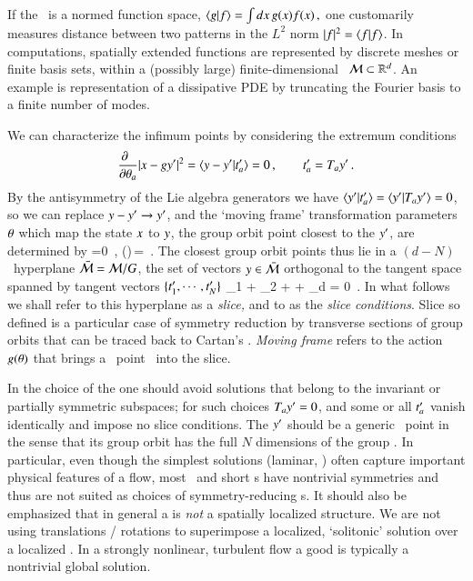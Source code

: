 \documentclass[preprint,12pt]{elsarticle} %
\begin{document}
If the \statesp\ is a normed function space,
\( %
\braket{g}{f} = \int dx \, {g}(x) f(x)
\,,
\) %
one customarily measures distance between two patterns in the $L^2$ norm
$|f|^2 = \braket{f}{f}$. In computations, spatially extended functions are
represented by discrete meshes or finite basis sets, within a (possibly
large) finite-dimensional \statesp\  ${\cal M} \subset \mathbb{R}^d$. An example
is representation of a dissipative PDE by truncating the Fourier basis
 to a finite number of modes.

We can characterize the infimum points by considering the extremum conditions
\[ %
\frac{\partial ~~}{\partial \gSpace_a} |\ssp - \LieEl\slicep|^2
   =
\braket{\sspRed - \slicep}{\sliceTan{a}}
   = 0
    \,,\qquad
	  \sliceTan{a} = \Lg_a \slicep
\,.
\] %
By the antisymmetry of the Lie algebra generators we have
$\braket{\slicep}{\sliceTan{a}} = \braket{\slicep}{\Lg_{a}\slicep}=0$, so
we can replace $y - {y'} \to {\ensuremath{y'}}$, and the
`moving frame' transformation
parameters ${\bf \theta}$ which map the state $x$ to $y$, the group
orbit point closest to the {\template} ${y'}$, are determined by
\beq
{} =0
    \,,\qquad
\LieEl(\gSpace)\,\sspRed = \ssp
\,.
The closest group orbit points thus lie in a $(d\!-\!N)$\dmn\ hyperplane
$\bar{\cal M} = {\cal M}/G$, the set of vectors $y \in  \bar{\cal M}$
orthogonal to the {\template} tangent space spanned by tangent vectors
$\{t'_{1},\cdots,t'_{N}\}$
\beq
\sspRed_1 + \sspRed_2
  + \cdots + \sspRed_d = 0
\,.
In what follows we shall refer to this hyperplane as a \emph{slice,} and
to   as the \emph{slice conditions}. Slice so defined is
a particular case of symmetry reduction by transverse sections of group
orbits that can be traced back to
Cartan's \mframes{}. \emph{Moving frame} refers to the action
$g({\bf \theta})$ that brings a \statesp\ point \ssp\ into the slice.


In the choice of the {\template} one should avoid solutions
that belong to the invariant or partially symmetric subspaces; for such
choices $T_{a}{y'}=0$, and some or all $t'_{a}$ vanish identically
and impose no slice conditions. The {\template} ${y'}$ should be a
generic \statesp\ point in the sense that its group orbit has the full
$N$ dimensions of the group \Group. In particular, even though the
simplest solutions (laminar, \etc) often capture important physical
features of a flow, most \eqva\ and short \po s have nontrivial
symmetries and thus are not suited as choices of symmetry-reducing
{\template s}.
It should also be emphasized that in general a {\template} is \emph{not}
a spatially {localized} structure. We are not using translations /
rotations to superimpose a localized, `solitonic' solution over a
localized {\template}. In a strongly nonlinear, turbulent flow a good
{\template} is typically a nontrivial global solution.
\end{document}
